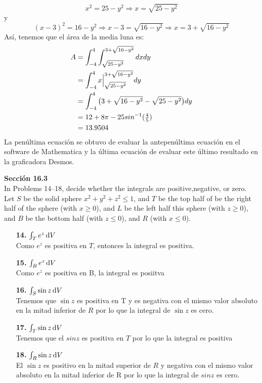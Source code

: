 \documentclass[11pt]{report}
\begin{document}
$$x^2=25-y^2 \Rightarrow x=\sqrt{25-y^2}$$
y
$$(x-3)^2=16-y^2\Rightarrow x-3=\sqrt{16-y^2}\Rightarrow x=3+\sqrt{16-y^2}$$
Así, tenemos que el área de la media luna es:
\begin{equation}
	\begin{split}
		A&=\int_{-4}^4\int_{\sqrt{25-y^2}}^{3+\sqrt{16-y^2}}dxdy\\
		 &=\int_{-4}^4x\Big|_{\sqrt{25-y^2}}^{3+\sqrt{16-y^2}}dy\\
		 &=\int_{-4}^4\big( 3+\sqrt{16-y^2}-\sqrt{25-y^2} \big)dy\\
		 &=12+8\pi-25sin^{-1}(\tfrac{4}{5})\\
		 &=13.9504 \\
	\end{split}
\end{equation}
La penúltima ecuación se obtuvo de evaluar la antepenúltima ecuación en el software
de Mathematica y la última ecuación de evaluar este último resultado en la graficadora Desmos.

\textbf{Sección 16.3} \\

In Problems 14–18, decide whether the integrals are positive,negative, or zero.
Let $S$ be the solid sphere $x^2 + y^2 + z^2 \leq 1$, and $T$ be the top half of
be the right half of the sphere (with $x \geq 0$), and $L$ be the left half
this sphere (with $z \geq 0$), and $B$ be the bottom half (with $z \leq 0$), and $R$
(with $x \leq 0$). \\
\begin{itemize}
	\item[\textbf{14.}]$ \int _T e^z \, \text dV$\\
	Como $e^z$ es positiva en $T$, entonces la integral es positiva.

	\item[\textbf{15.}]$ \int _B e^z \, \text dV $\\
	Como $e^z$ es positiva en B, la integral es posiitva

	\item[\textbf{16.}]$\int _S \sin{z} \, \text dV$\\
	Tenemos que $\sin z$ es positiva en T y  es negativa con el mismo valor absoluto en la
	mitad inferior de $R$ por lo que la integral de $\sin z$ es cero.

	\item[\textbf{17.}]$ \int _T \sin{z} \, \text dV$\\
	Tenemos que el $sin z $ es positiva en $T$ por lo que la integral es positiva

	\item[\textbf{18.}]$\int _R \sin{z} \, \text dV $\\
	El $\sin z$ es positivo en la mitad superior de $R$ y negativa con el mismo valor absoluto
	en la mitad inferior de R por lo que la integral de $sin z$ es cero.
\end{itemize}
\end{document}
